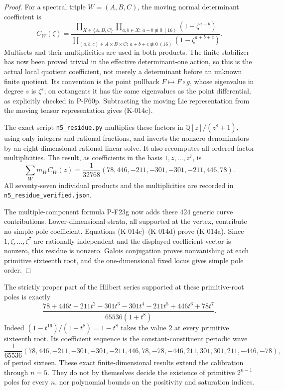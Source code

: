 \begin{proof}
For a spectral triple $W=(A,B,C)$, the moving normal determinant
coefficient is
\[
 C_W(\zeta)=
 \frac{\displaystyle
     \prod_{X\in\{A,B,C\}}
       \prod_{a,b\in X:\ a-b\not\equiv0\ (16)}
                           (1-\zeta^{a-b})}
      {\displaystyle
       \prod_{(a,b,c)\in A\times B\times C:\ a+b+c\not\equiv0\ (16)}
                           (1-\zeta^{a+b+c})}.              \tag{K-014c}
\]
Multisets and their multiplicities are used in both products.  The
finite stabilizer has now been proved trivial in the effective
determinant-one action, so this is the actual local quotient
coefficient, not merely a determinant before an unknown finite
quotient.  Its convention is the point pullback
$F\mapsto F\circ g$, whose eigenvalue in degree $s$ is $\zeta^s$;
on cotangents it has the same eigenvalues as the point differential,
as explicitly checked in P-F60p.  Subtracting the moving Lie
representation from the moving tensor representation gives
(K-014c).

The exact script \texttt{n5\_residue.py} multiplies these factors in
$\mathbb Q[z]/(z^8+1)$, using only integers and rational fractions,
and inverts the nonzero denominators by an eight-dimensional rational
linear solve.  It also recomputes all ordered-factor multiplicities.
The result, as coefficients in the basis $1,z,\ldots,z^7$, is
\[
       \sum_W m_W C_W(z)
       =\frac1{32768}(78,446,-211,-301,-301,-211,446,78).
                                                               \tag{K-014d}
\]
All seventy-seven individual products and the multiplicities are
recorded in \nolinkurl{n5_residue_verified.json}.

The multiple-component formula P-F23g now adds these $424$ generic
curve contributions.  Lower-dimensional strata, all supported at
the vertex, contribute no simple-pole coefficient.  Equations
(K-014c)--(K-014d) prove (K-014a).  Since
$1,\zeta,\ldots,\zeta^7$ are rationally independent and the displayed
coefficient vector is nonzero, this residue is nonzero.
Galois conjugation proves nonvanishing at each primitive sixteenth
root, and the one-dimensional fixed locus gives simple pole order.
\end{proof}

The strictly proper part of the Hilbert series supported at these
primitive-root poles is exactly
\[
 \frac{78+446t-211t^2-301t^3-301t^4-211t^5+446t^6+78t^7}
      {65536(1+t^8)}.                                       \tag{K-014e}
\]
Indeed $(1-t^{16})/(1+t^8)=1-t^8$ takes the value $2$ at every
primitive sixteenth root.  Its coefficient sequence is the
constant-constituent periodic wave
\[
 \frac1{65536}
 (78,446,-211,-301,-301,-211,446,78,
  -78,-446,211,301,301,211,-446,-78),                        \tag{K-014f}
\]
of period sixteen.  These exact finite-dimensional results extend
the calibration through $n=5$.  They do not by themselves decide
the existence of primitive $2^{n-1}$ poles for every $n$, nor
polynomial bounds on the positivity and saturation indices.
